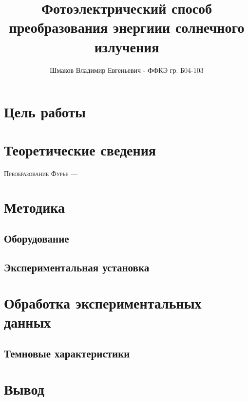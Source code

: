 \documentclass[a4paper, 12pt]{extarticle}
\title{\textcolor{main_title}{Фотоэлектрический способ преобразования энергиии солнечного излучения}}
\author{Шмаков Владимир Евгеньевич - ФФКЭ гр. Б04-103}
\begin{document}
\maketitle



\section*{\textcolor{header}{Цель работы}}
\section*{\textcolor{header}{Теоретические сведения}}

\lettrine{\textcolor{defenition}{П}}{\textcolor{defenition}{реобразование Фурье}} —
\section*{\textcolor{header}{Методика}}

\subsection*{\textcolor{sub_header}{Оборудование}}

\subsection*{\textcolor{sub_header}{Экспериментальная установка}}


\section*{\textcolor{header}{Обработка экспериментальных данных}}

\subsection*{\textcolor{sub_header}{Темновые характеристики}}

\section*{\textcolor{header}{Вывод}}
\end{document}
